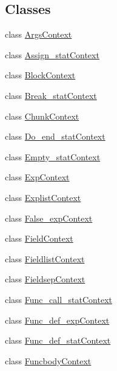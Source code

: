 \subsection*{Classes}
\begin{DoxyCompactItemize}
\item 
class \mbox{\hyperlink{classzlua_1_1_lua_parser_1_1_args_context}{Args\+Context}}
\item 
class \mbox{\hyperlink{classzlua_1_1_lua_parser_1_1_assign__stat_context}{Assign\+\_\+stat\+Context}}
\item 
class \mbox{\hyperlink{classzlua_1_1_lua_parser_1_1_block_context}{Block\+Context}}
\item 
class \mbox{\hyperlink{classzlua_1_1_lua_parser_1_1_break__stat_context}{Break\+\_\+stat\+Context}}
\item 
class \mbox{\hyperlink{classzlua_1_1_lua_parser_1_1_chunk_context}{Chunk\+Context}}
\item 
class \mbox{\hyperlink{classzlua_1_1_lua_parser_1_1_do__end__stat_context}{Do\+\_\+end\+\_\+stat\+Context}}
\item 
class \mbox{\hyperlink{classzlua_1_1_lua_parser_1_1_empty__stat_context}{Empty\+\_\+stat\+Context}}
\item 
class \mbox{\hyperlink{classzlua_1_1_lua_parser_1_1_exp_context}{Exp\+Context}}
\item 
class \mbox{\hyperlink{classzlua_1_1_lua_parser_1_1_explist_context}{Explist\+Context}}
\item 
class \mbox{\hyperlink{classzlua_1_1_lua_parser_1_1_false__exp_context}{False\+\_\+exp\+Context}}
\item 
class \mbox{\hyperlink{classzlua_1_1_lua_parser_1_1_field_context}{Field\+Context}}
\item 
class \mbox{\hyperlink{classzlua_1_1_lua_parser_1_1_fieldlist_context}{Fieldlist\+Context}}
\item 
class \mbox{\hyperlink{classzlua_1_1_lua_parser_1_1_fieldsep_context}{Fieldsep\+Context}}
\item 
class \mbox{\hyperlink{classzlua_1_1_lua_parser_1_1_func__call__stat_context}{Func\+\_\+call\+\_\+stat\+Context}}
\item 
class \mbox{\hyperlink{classzlua_1_1_lua_parser_1_1_func__def__exp_context}{Func\+\_\+def\+\_\+exp\+Context}}
\item 
class \mbox{\hyperlink{classzlua_1_1_lua_parser_1_1_func__def__stat_context}{Func\+\_\+def\+\_\+stat\+Context}}
\item 
class \mbox{\hyperlink{classzlua_1_1_lua_parser_1_1_funcbody_context}{Funcbody\+Context}}

\end{DoxyCompactItemize}

